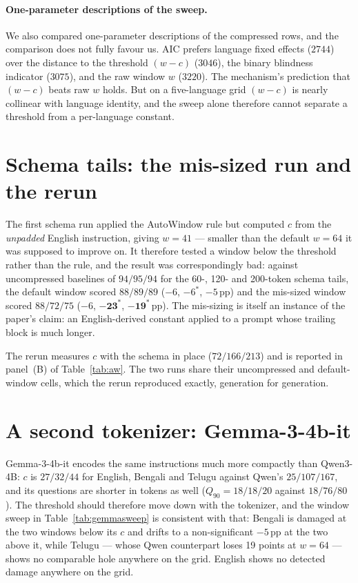 \documentclass{article}
\begin{document}
\paragraph{One-parameter descriptions of the sweep.}
We also compared one-parameter descriptions of the compressed rows, and
the comparison does not fully favour us. AIC prefers language fixed
effects ($2744$) over the distance to the threshold $(w{-}c)$ ($3046$),
the binary blindness indicator ($3075$), and the raw window $w$ ($3220$).
The mechanism's prediction that $(w{-}c)$ beats raw $w$ holds. But on a
five-language grid $(w{-}c)$ is nearly collinear with language identity,
and the sweep alone therefore cannot separate a threshold from a
per-language constant.

\section{Schema tails: the mis-sized run and the rerun}
\label{app:schema}

The first schema run applied the AutoWindow rule but computed $c$ from
the \emph{unpadded} English instruction, giving $w{=}41$ --- smaller than
the default $w{=}64$ it was supposed to improve on. It therefore tested a
window below the threshold rather than the rule, and the result was
correspondingly bad: against uncompressed baselines of $94/95/94$ for the
60-, 120- and 200-token schema tails, the default window scored
$88/89/89$ ($-6$, $-6^{*}$, $-5$\,pp) and the mis-sized window scored
$88/72/75$ ($-6$, $\mathbf{-23}^{*}$, $\mathbf{-19}^{*}$\,pp). The
mis-sizing is itself an instance of the paper's claim: an English-derived
constant applied to a prompt whose trailing block is much longer.

The rerun measures $c$ with the schema in place
($72/166/213$) and is reported in panel~(B) of Table~\ref{tab:aw}. The
two runs share their uncompressed and default-window cells, which the
rerun reproduced exactly, generation for generation.

\section{A second tokenizer: Gemma-3-4b-it}
\label{app:gemma}

Gemma-3-4b-it encodes the same instructions much more compactly than
Qwen3-4B: $c$ is $27/32/44$ for English, Bengali and Telugu against
Qwen's $25/107/167$, and its questions are shorter in tokens as well
($Q_{90} = 18/18/20$ against $18/76/80$). The threshold should therefore
move down with the tokenizer, and the window sweep in
Table~\ref{tab:gemmasweep} is consistent with that: Bengali is damaged at
the two windows below its $c$ and drifts to a non-significant $-5$\,pp at
the two above it, while Telugu --- whose Qwen counterpart loses 19 points
at $w{=}64$ --- shows no comparable hole anywhere on the grid. English shows
no detected damage anywhere on the grid.
\end{document}
